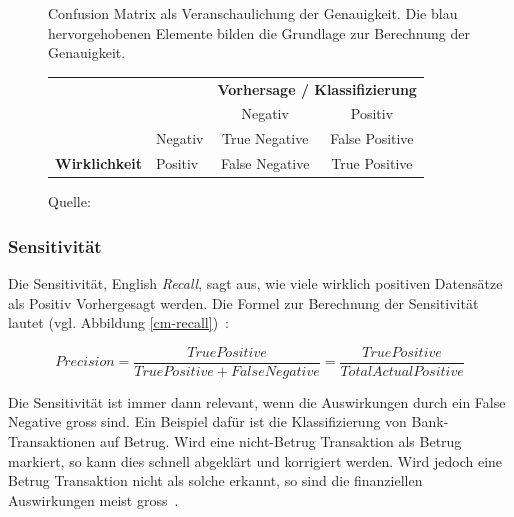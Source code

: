 \begin{figure}[h!]
    \centering
    \captionsetup{width=.9\linewidth}
    \caption[Confusion Matrix als Veranschaulichung der Genauigkeit]{Confusion Matrix als Veranschaulichung der Genauigkeit. Die blau hervorgehobenen Elemente bilden die Grundlage zur Berechnung der Genauigkeit.}
    \def\arraystretch{1.5}
    \begin{tabular}{llcc}
        \multicolumn{2}{l}{}                                                                        & \multicolumn{2}{c}{\textbf{Vorhersage / Klassifizierung}}                                         \\ \cline{3-4} 
        \multicolumn{1}{c}{\textbf{}}                                & \multicolumn{1}{l|}{}        & \multicolumn{1}{c|}{Negativ}        & \multicolumn{1}{c|}{\cellcolor[HTML]{B5D0EE}Positiv}        \\ \cline{2-4} 
        \multicolumn{1}{l|}{}                                        & \multicolumn{1}{l|}{Negativ} & \multicolumn{1}{c|}{True Negative}  & \multicolumn{1}{c|}{\cellcolor[HTML]{B5D0EE}False Positive} \\ \cline{2-4} 
        \multicolumn{1}{l|}{\multirow{-2}{*}{\textbf{Wirklichkeit}}} & \multicolumn{1}{l|}{Positiv} & \multicolumn{1}{c|}{False Negative} & \multicolumn{1}{c|}{\cellcolor[HTML]{B5D0EE}True Positive}  \\ \cline{2-4} 
    \end{tabular}
    \caption*{Quelle: \textcite{TDSAccuracy}}
    \label{cm-precision}
\end{figure}

\subsubsection{Sensitivität}

Die Sensitivität, English \textit{Recall}, sagt aus, wie viele wirklich positiven Datensätze als Positiv Vorhergesagt werden. Die Formel zur Berechnung der Sensitivität lautet (vgl. Abbildung \ref{cm-recall})~\autocite{TDSAccuracy}: 

$$Precision = \frac{True Positive}{True Positive + False Negative} = \frac{True Positive}{Total Actual Positive}$$

Die Sensitivität ist immer dann relevant, wenn die Auswirkungen durch ein False Negative gross sind. Ein Beispiel dafür ist die Klassifizierung von Bank-Transaktionen auf Betrug. Wird eine nicht-Betrug Transaktion als Betrug markiert, so kann dies schnell abgeklärt und korrigiert werden. Wird jedoch eine Betrug Transaktion nicht als solche erkannt, so sind die finanziellen Auswirkungen meist gross~\autocite{TDSAccuracy}.

